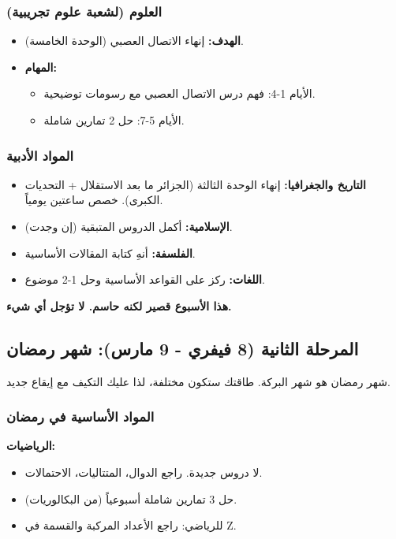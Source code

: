 \documentclass[12pt,a4paper]{book}
\newcommand{\importantAr}[1]{%
	\begin{important}
		\bfseries #1
	\end{important}
}
\begin{document}
	\subsubsection*{العلوم (لشعبة علوم تجريبية)}
	\begin{itemize}
		\item \textbf{الهدف:} إنهاء الاتصال العصبي (الوحدة الخامسة).
		\item \textbf{المهام:}
		\begin{itemize}
			\item الأيام 1-4: فهم درس الاتصال العصبي مع رسومات توضيحية.
			\item الأيام 5-7: حل 2 تمارين شاملة.
		\end{itemize}
	\end{itemize}
	
	\subsubsection*{المواد الأدبية}
	\begin{itemize}
		\item \textbf{التاريخ والجغرافيا:} إنهاء الوحدة الثالثة (الجزائر ما بعد الاستقلال + التحديات الكبرى). خصص ساعتين يومياً.
		\item \textbf{الإسلامية:} أكمل الدروس المتبقية (إن وجدت).
		\item \textbf{الفلسفة:} أنهِ كتابة المقالات الأساسية.
		\item \textbf{اللغات:} ركز على القواعد الأساسية وحل 1-2 موضوع.
	\end{itemize}
	
	\importantAr{هذا الأسبوع قصير لكنه حاسم. لا تؤجل أي شيء.}
	
	\subsection{المرحلة الثانية (8 فيفري - 9 مارس): شهر رمضان}
	شهر رمضان هو شهر البركة. طاقتك ستكون مختلفة، لذا عليك التكيف مع إيقاع جديد.
	
	
	\subsubsection*{المواد الأساسية في رمضان}
	\textbf{الرياضيات:}
	\begin{itemize}
		\item لا دروس جديدة. راجع الدوال، المتتاليات، الاحتمالات.
		\item حل 3 تمارين شاملة أسبوعياً (من البكالوريات).
		\item للرياضي: راجع الأعداد المركبة والقسمة في Z.
	\end{itemize}
	
\end{document}
